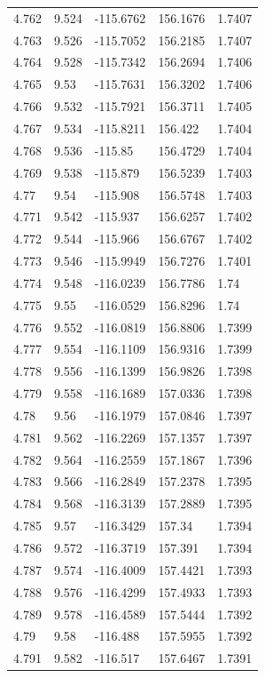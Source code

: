 \begin{tabular}{lllll}
4.762 & 9.524 & -115.6762 & 156.1676 & 1.7407 \\
4.763 & 9.526 & -115.7052 & 156.2185 & 1.7407 \\
4.764 & 9.528 & -115.7342 & 156.2694 & 1.7406 \\
4.765 & 9.53 & -115.7631 & 156.3202 & 1.7406 \\
4.766 & 9.532 & -115.7921 & 156.3711 & 1.7405 \\
4.767 & 9.534 & -115.8211 & 156.422 & 1.7404 \\
4.768 & 9.536 & -115.85 & 156.4729 & 1.7404 \\
4.769 & 9.538 & -115.879 & 156.5239 & 1.7403 \\
4.77 & 9.54 & -115.908 & 156.5748 & 1.7403 \\
4.771 & 9.542 & -115.937 & 156.6257 & 1.7402 \\
4.772 & 9.544 & -115.966 & 156.6767 & 1.7402 \\
4.773 & 9.546 & -115.9949 & 156.7276 & 1.7401 \\
4.774 & 9.548 & -116.0239 & 156.7786 & 1.74 \\
4.775 & 9.55 & -116.0529 & 156.8296 & 1.74 \\
4.776 & 9.552 & -116.0819 & 156.8806 & 1.7399 \\
4.777 & 9.554 & -116.1109 & 156.9316 & 1.7399 \\
4.778 & 9.556 & -116.1399 & 156.9826 & 1.7398 \\
4.779 & 9.558 & -116.1689 & 157.0336 & 1.7398 \\
4.78 & 9.56 & -116.1979 & 157.0846 & 1.7397 \\
4.781 & 9.562 & -116.2269 & 157.1357 & 1.7397 \\
4.782 & 9.564 & -116.2559 & 157.1867 & 1.7396 \\
4.783 & 9.566 & -116.2849 & 157.2378 & 1.7395 \\
4.784 & 9.568 & -116.3139 & 157.2889 & 1.7395 \\
4.785 & 9.57 & -116.3429 & 157.34 & 1.7394 \\
4.786 & 9.572 & -116.3719 & 157.391 & 1.7394 \\
4.787 & 9.574 & -116.4009 & 157.4421 & 1.7393 \\
4.788 & 9.576 & -116.4299 & 157.4933 & 1.7393 \\
4.789 & 9.578 & -116.4589 & 157.5444 & 1.7392 \\
4.79 & 9.58 & -116.488 & 157.5955 & 1.7392 \\
4.791 & 9.582 & -116.517 & 157.6467 & 1.7391 \\

\end{tabular}
